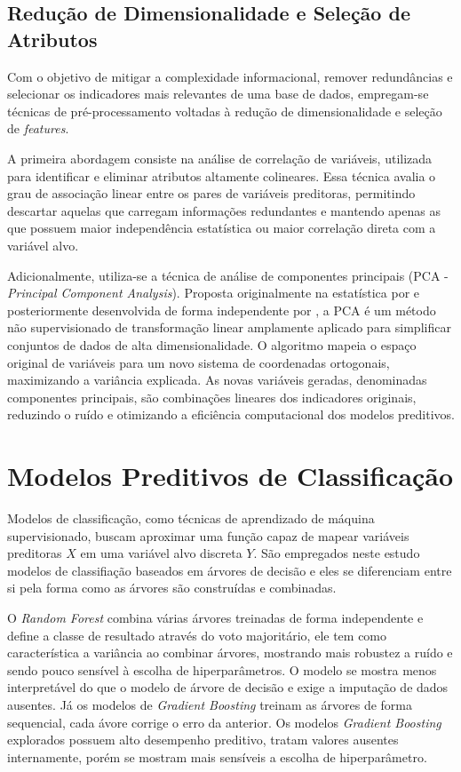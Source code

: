 \subsection{Redução de Dimensionalidade e Seleção de Atributos}

Com o objetivo de mitigar a complexidade informacional, remover redundâncias e selecionar os indicadores mais relevantes de uma base de dados, empregam-se técnicas de pré-processamento voltadas à redução de dimensionalidade e seleção de \textit{features}. 

A primeira abordagem consiste na análise de correlação de variáveis, utilizada para identificar e eliminar atributos altamente colineares. Essa técnica avalia o grau de associação linear entre os pares de variáveis preditoras, permitindo descartar aquelas que carregam informações redundantes e mantendo apenas as que possuem maior independência estatística ou maior correlação direta com a variável alvo.

Adicionalmente, utiliza-se a técnica de análise de componentes principais (PCA - \textit{Principal Component Analysis}). Proposta originalmente na estatística por  e posteriormente desenvolvida de forma independente por  , a PCA é um método não supervisionado de transformação linear amplamente aplicado para simplificar conjuntos de dados de alta dimensionalidade. O algoritmo mapeia o espaço original de variáveis para um novo sistema de coordenadas ortogonais, maximizando a variância explicada. As novas variáveis geradas, denominadas componentes principais, são combinações lineares dos indicadores originais, reduzindo o ruído e otimizando a eficiência computacional dos modelos preditivos.

\section{Modelos Preditivos de Classificação}

Modelos de classificação, como técnicas de aprendizado de máquina supervisionado, buscam aproximar uma função capaz de mapear variáveis preditoras $X$ em uma variável alvo discreta $Y$. São empregados neste estudo modelos de classifiação baseados em árvores de decisão e eles se diferenciam entre si pela forma como as árvores são construídas e combinadas. 

O \textit{Random Forest}  combina várias árvores treinadas de forma independente e define a classe de resultado através do voto majoritário, ele tem como característica a variância ao combinar árvores, mostrando mais robustez a ruído e sendo pouco sensível à escolha de hiperparâmetros. O modelo se mostra menos interpretável do que o modelo de árvore de decisão e exige a imputação de dados ausentes. Já os modelos de \textit{Gradient Boosting}  treinam as árvores de forma sequencial, cada ávore corrige o erro da anterior. Os modelos \textit{Gradient Boosting} explorados possuem alto desempenho preditivo, tratam valores ausentes internamente, porém se mostram mais sensíveis a escolha de hiperparâmetro.

